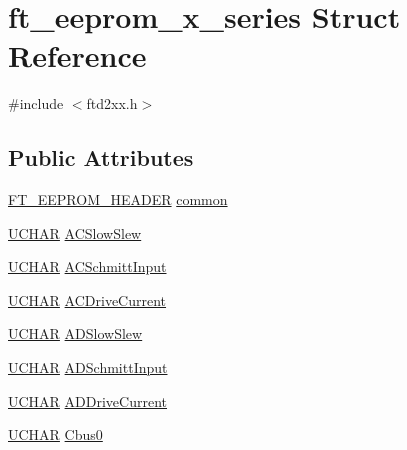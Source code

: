 \hypertarget{structft__eeprom__x__series}{}\section{ft\+\_\+eeprom\+\_\+x\+\_\+series Struct Reference}
\label{structft__eeprom__x__series}


{\ttfamily \#include $<$ftd2xx.\+h$>$}

\subsection*{Public Attributes}
\begin{DoxyCompactItemize}
\item 
\hyperlink{LALUsbMLx64_2include_2ftd2xx_8h_ad5a6f519cd67a403fd8742756462394e}{F\+T\+\_\+\+E\+E\+P\+R\+O\+M\+\_\+\+H\+E\+A\+D\+ER} \hyperlink{structft__eeprom__x__series_a4d1ac63e7dc2e8e677edcc43b566dc01}{common}
\item 
\hyperlink{CatCaloProto40MHz_2inc_2WinTypes_8h_a4f4bb67531a9bf6f0b9c6ad76aeba587}{U\+C\+H\+AR} \hyperlink{structft__eeprom__x__series_aa08fe7573f5f822e12a34973055c52e3}{A\+C\+Slow\+Slew}
\item 
\hyperlink{CatCaloProto40MHz_2inc_2WinTypes_8h_a4f4bb67531a9bf6f0b9c6ad76aeba587}{U\+C\+H\+AR} \hyperlink{structft__eeprom__x__series_af0941a8b6cbcfb69a84c9e9bd9751e4e}{A\+C\+Schmitt\+Input}
\item 
\hyperlink{CatCaloProto40MHz_2inc_2WinTypes_8h_a4f4bb67531a9bf6f0b9c6ad76aeba587}{U\+C\+H\+AR} \hyperlink{structft__eeprom__x__series_a62017256a98fdfbd1ec5a662725f9c84}{A\+C\+Drive\+Current}
\item 
\hyperlink{CatCaloProto40MHz_2inc_2WinTypes_8h_a4f4bb67531a9bf6f0b9c6ad76aeba587}{U\+C\+H\+AR} \hyperlink{structft__eeprom__x__series_a3a1988ab68373c2fdc375cb4c038666f}{A\+D\+Slow\+Slew}
\item 
\hyperlink{CatCaloProto40MHz_2inc_2WinTypes_8h_a4f4bb67531a9bf6f0b9c6ad76aeba587}{U\+C\+H\+AR} \hyperlink{structft__eeprom__x__series_addfb6cbf3c524edfbde9dbaf37f1f5e0}{A\+D\+Schmitt\+Input}
\item 
\hyperlink{CatCaloProto40MHz_2inc_2WinTypes_8h_a4f4bb67531a9bf6f0b9c6ad76aeba587}{U\+C\+H\+AR} \hyperlink{structft__eeprom__x__series_a22a0cc77e2bf346e29d171194a91bc95}{A\+D\+Drive\+Current}
\item 
\hyperlink{CatCaloProto40MHz_2inc_2WinTypes_8h_a4f4bb67531a9bf6f0b9c6ad76aeba587}{U\+C\+H\+AR} \hyperlink{structft__eeprom__x__series_a8204c3cd3a8d8ea0f1461217fdc7ce83}{Cbus0}

\end{DoxyCompactItemize}
